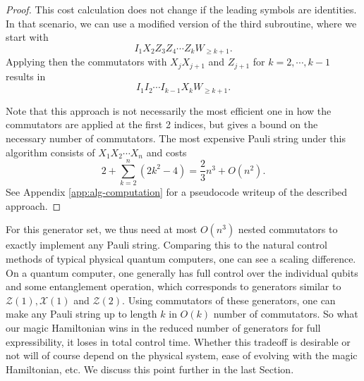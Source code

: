 \documentclass[12pt, a4-paper]{amsart}
\newcommand{\cX}{\mathcal{X}}
\newcommand{\cZ}{\mathcal{Z}}
\numberwithin{equation}{section}
\begin{document}
\begin{proof}
This cost calculation does not change if the leading symbols are identities. In that scenario, we can use a modified version of the third subroutine, where we start with
\begin{equation}
    I_1 X_2 Z_3 Z_4 \cdots Z_k W_{\geq k+1}.
\end{equation}
Applying then the commutators with $X_j X_{j+1}$ and $Z_{j+1}$ for $ k = 2, \cdots, k-1$ results in
\begin{equation}
    I_1 I_2 \cdots I_{k-1} X_k W_{\geq k+1}.
\end{equation}

Note that this approach is not necessarily the most efficient one in how the commutators are applied at the first 2 indices, but gives a bound on the necessary number of commutators. The most expensive Pauli string under this algorithm consists of $X_1 X_2 \cdots X_n$ and costs
\begin{equation}
    2+\sum_{k=2}^n (2k^2-4) = \frac23 n^3 +O(n^2).
\end{equation}
See Appendix \ref{app:alg-computation} for a pseudocode writeup of the described approach.\end{proof}

For this generator set, we thus need at most $O(n^3)$ nested commutators to exactly implement any Pauli string. Comparing this to the natural control methods of typical physical quantum computers, one can see a scaling difference. On a quantum computer, one generally has full control over the individual qubits and some entanglement operation, which corresponds to generators similar to $\cZ(1), \cX(1)$ and $\cZ(2)$. Using commutators of these generators, one can make any Pauli string up to length $k$ in $O(k)$ number of commutators. So what our magic Hamiltonian wins in the reduced number of generators for full expressibility, it loses in total control time. Whether this tradeoff is desirable or not will of course depend on the physical system, ease of evolving with the magic Hamiltonian, etc. We discuss this point further in the last Section.
\end{document}
